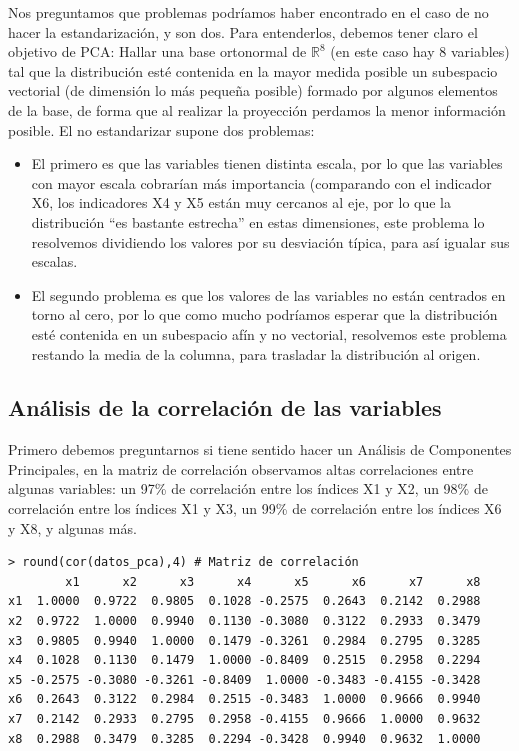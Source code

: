 \documentclass[12pt]{article}
\begin{document}
Nos preguntamos que problemas podríamos haber encontrado en el caso de
no hacer la estandarización, y son dos. Para entenderlos, debemos
tener claro el objetivo de PCA: Hallar una base ortonormal de
$\mathbb{R}^8$ (en este caso hay 8 variables) tal que la distribución
esté contenida en la mayor medida posible un subespacio vectorial (de
dimensión lo más pequeña posible) formado por algunos elementos de la
base, de forma que al realizar la proyección perdamos la menor
información posible. El no estandarizar supone dos problemas:
\begin{itemize}
\item El primero es que las
variables tienen distinta escala, por lo que las variables con mayor
escala cobrarían más importancia (comparando con el indicador X6, los
indicadores X4 y X5 están muy cercanos al eje, por lo que la
distribución ``es bastante estrecha'' en estas dimensiones, este
problema lo resolvemos dividiendo los valores por su desviación
típica, para así igualar sus escalas.
\item El segundo problema es que los valores de las variables no están
  centrados en torno al cero, por lo que como mucho podríamos esperar
  que la distribución esté contenida en un subespacio afín y no
  vectorial, resolvemos este problema restando la media de la columna,
  para trasladar la distribución al origen.
\end{itemize}

\subsection{Análisis de la correlación de las variables} \label{sec:acp}

Primero debemos preguntarnos si tiene sentido hacer un Análisis de
Componentes Principales, en la matriz de correlación observamos altas
correlaciones entre algunas variables: un 97\% de correlación entre
los índices X1 y X2, un 98\% de correlación entre los índices X1 y X3,
un 99\% de correlación entre los índices X6 y X8, y algunas más.

\begin{verbatim}
> round(cor(datos_pca),4) # Matriz de correlación
        x1      x2      x3      x4      x5      x6      x7      x8
x1  1.0000  0.9722  0.9805  0.1028 -0.2575  0.2643  0.2142  0.2988
x2  0.9722  1.0000  0.9940  0.1130 -0.3080  0.3122  0.2933  0.3479
x3  0.9805  0.9940  1.0000  0.1479 -0.3261  0.2984  0.2795  0.3285
x4  0.1028  0.1130  0.1479  1.0000 -0.8409  0.2515  0.2958  0.2294
x5 -0.2575 -0.3080 -0.3261 -0.8409  1.0000 -0.3483 -0.4155 -0.3428
x6  0.2643  0.3122  0.2984  0.2515 -0.3483  1.0000  0.9666  0.9940
x7  0.2142  0.2933  0.2795  0.2958 -0.4155  0.9666  1.0000  0.9632
x8  0.2988  0.3479  0.3285  0.2294 -0.3428  0.9940  0.9632  1.0000
\end{verbatim}
\end{document}
